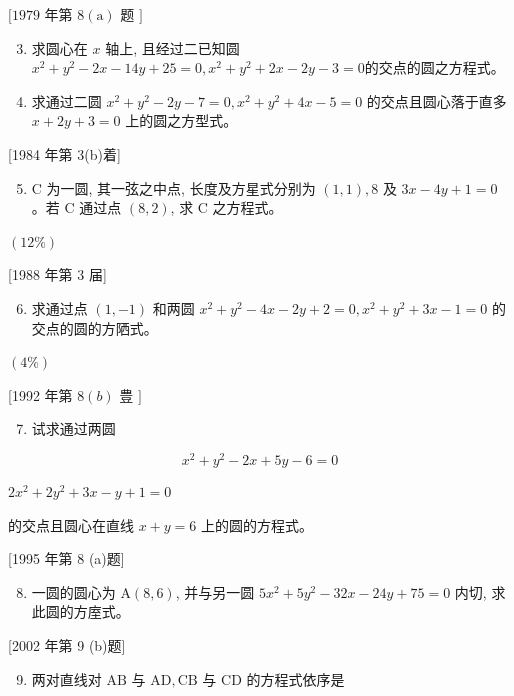 \documentclass[10pt]{article}
\begin{document}
$[1979$ 年第 $8(\mathrm{a})$ 题 $]$

\begin{enumerate}
  \setcounter{enumi}{2}
  \item 求圆心在 $x$ 轴上, 且经过二已知圆 $x^{2}+y^{2}-2 x-14 y+25=0, x^{2}+y^{2}+2 x-2 y-3=0$的交点的圆之方程式。

  \item 求通过二圆 $x^{2}+y^{2}-2 y-7=0, x^{2}+y^{2}+4 x-5=0$ 的交点且圆心落于直多 $x+2 y+3=0$ 上的圆之方型式。

\end{enumerate}

[1984 年第 3(b)着]

\begin{enumerate}
  \setcounter{enumi}{4}
  \item $\mathrm{C}$ 为一圆, 其一弦之中点, 长度及方星式分别为 $(1,1), 8$ 及 $3 x-4 y+1=0$ 。若 $\mathrm{C}$ 通过点 $(8,2)$, 求 $\mathrm{C}$ 之方程式。
\end{enumerate}

$(12 \%)$

[1988 年第 3 届]

\begin{enumerate}
  \setcounter{enumi}{5}
  \item 求通过点 $(1,-1)$ 和两圆 $x^{2}+y^{2}-4 x-2 y+2=0, x^{2}+y^{2}+3 x-1=0$ 的交点的圆的方䧈式。
\end{enumerate}

$(4 \%)$

[1992 年第 $8(b)$ 豊 $]$

\begin{enumerate}
  \setcounter{enumi}{6}
  \item 试求通过两圆
\end{enumerate}

$$
x^{2}+y^{2}-2 x+5 y-6=0
$$

$2 x^{2}+2 y^{2}+3 x-y+1=0$

的交点且圆心在直线 $x+y=6$ 上的圆的方程式。

[1995 年第 8 (a)题]

\begin{enumerate}
  \setcounter{enumi}{7}
  \item 一圆的圆心为 $\mathrm{A}(8,6)$, 并与另一圆 $5 x^{2}+5 y^{2}-32 x-24 y+75=0$ 内切, 求此圆的方庢式。
\end{enumerate}

[2002 年第 9 (b)题]

\begin{enumerate}
  \setcounter{enumi}{8}
  \item 两对直线对 $\mathrm{AB}$ 与 $\mathrm{AD}, \mathrm{CB}$ 与 $\mathrm{CD}$ 的方程式依序是
\end{enumerate}
\end{document}

